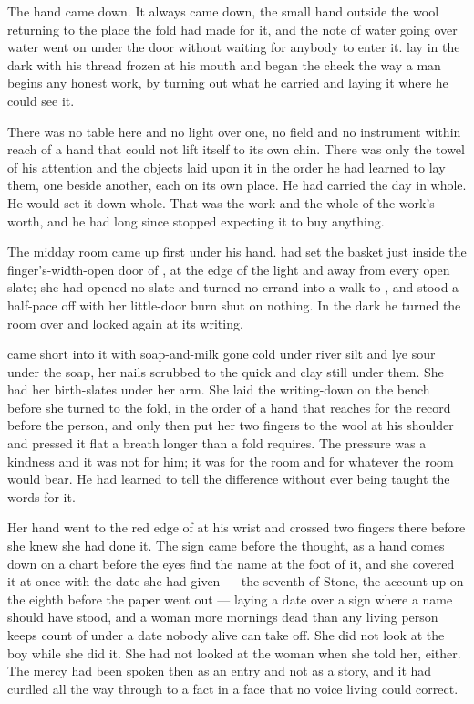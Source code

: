 The hand came down. It always came down, the small hand outside the wool returning to the place the fold had made for it, and the note of water going over water went on under the door without waiting for anybody to enter it.  lay in the dark with his thread frozen at his mouth and began the check the way a man begins any honest work, by turning out what he carried and laying it where he could see it.

There was no table here and no light over one, no field and no instrument within reach of a hand that could not lift itself to its own chin. There was only the towel of his attention and the objects laid upon it in the order he had learned to lay them, one beside another, each on its own place. He had carried the day in whole. He would set it down whole. That was the work and the whole of the work's worth, and he had long since stopped expecting it to buy anything.

\scenebreak

The midday room came up first under his hand.  had set the basket just inside the finger's-width-open door of , at the edge of the light and away from every open slate; she had opened no slate and turned no errand into a walk to , and stood a half-pace off with her little-door burn shut on nothing. In the dark he turned the room over and looked again at its writing.

 came short into it with soap-and-milk gone cold under river silt and lye sour under the soap, her nails scrubbed to the quick and clay still under them. She had her birth-slates under her arm. She laid the writing-down on the bench before she turned to the fold, in the order of a hand that reaches for the record before the person, and only then put her two fingers to the wool at his shoulder and pressed it flat a breath longer than a fold requires. The pressure was a kindness and it was not for him; it was for the room and for whatever the room would bear. He had learned to tell the difference without ever being taught the words for it.

Her hand went to the red edge of  at his wrist and crossed two fingers there before she knew she had done it. The sign came before the thought, as a hand comes down on a chart before the eyes find the name at the foot of it, and she covered it at once with the date she had given  --- the seventh of Stone, the account up on the eighth before the paper went out --- laying a date over a sign where a name should have stood, and a woman more mornings dead than any living person keeps count of under a date nobody alive can take off. She did not look at the boy while she did it. She had not looked at the woman when she told her, either. The mercy had been spoken then as an entry and not as a story, and it had curdled all the way through to a fact in a face that no voice living could correct.

